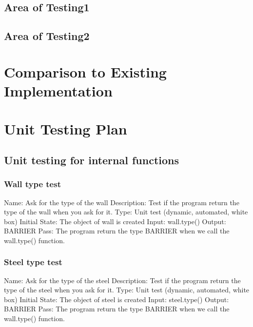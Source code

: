 \documentclass{article}
\begin{document}
\subsection{Area of Testing1}
\subsection{Area of Testing2}

\section{Comparison to Existing Implementation}

\section{Unit Testing Plan}
\subsection{Unit testing for internal functions}
\subsubsection{Wall type test}
Name:  Ask for the type of the wall\newline
Description: Test if the program return the type of the wall when you ask for it. \newline
Type: Unit test (dynamic, automated, white box) \newline
Initial State:  The object of wall is created \newline
Input: wall.type()\newline
Output: BARRIER  \newline
Pass:   The program return the type BARRIER when we call the wall.type() function. \newline

\subsubsection{Steel type test}
Name:  Ask for the type of the steel\newline
Description: Test if the program return the type of the steel when you ask for it. \newline
Type: Unit test (dynamic, automated, white box) \newline
Initial State:  The object of steel is created \newline
Input: steel.type()\newline
Output: BARRIER\newline
Pass:  The program return the type BARRIER when we call the wall.type() function. \newline
\end{document}
